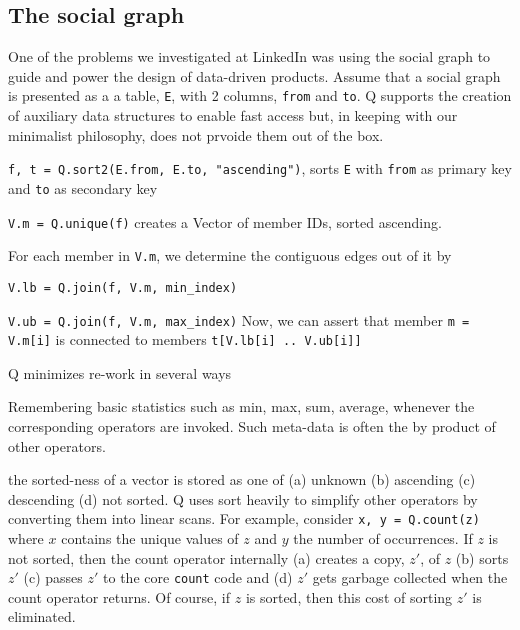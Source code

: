 \subsection{The social graph}
\label{social_graph}

One of the problems we investigated at LinkedIn was using the social graph to
guide and power the design of data-driven products.
Assume that a social graph is presented as a 
a table, {\tt E}, with 2 columns, {\tt from} and {\tt to}. Q supports the
creation of auxiliary data structures to enable fast access but, in keeping with
our minimalist philosophy, does not prvoide them out of the box.
\be
\item {\tt f, t = Q.sort2(E.from, E.to, "ascending")}, sorts {\tt E}
with {\tt from} as primary key and {\tt to} as
secondary key
\item {\tt V.m = Q.unique(f)} creates a Vector of 
member IDs, sorted ascending. 
\item For each member in {\tt V.m}, we determine the contiguous edges out of it
  by 
  \be
\item {\tt V.lb = Q.join(f, V.m, min\_index)}
\item {\tt V.ub = Q.join(f, V.m, max\_index)}
  \ee
Now, we can assert that member
{\tt m = V.m[i]} is connected to members {\tt t[V.lb[i] .. V.ub[i]]}
\ee

Q minimizes re-work in several ways
\be
\item 
Remembering basic statistics such as min, max, sum, average, whenever the
corresponding operators are invoked. 
Such meta-data is often the by product of other operators.
\item the sorted-ness of a vector is
stored as one of (a) unknown (b) ascending (c) descending (d) not sorted. 
Q
uses sort heavily to simplify other operators by converting them into linear
scans. 
For example, consider {\tt x, y  = Q.count(z)} where \(x\) contains the
unique values of \(z\) and \(y\) the number of occurrences. If \(z\) is not
sorted, then the count operator internally (a) creates a copy, \(z'\), of \(z\)
(b) sorts \(z'\) (c) passes \(z'\) to the core {\tt count} code and (d) \(z'\) gets
garbage collected when the count operator returns. Of course, if \(z\) is
sorted, then this cost of sorting \(z'\) is eliminated.

\ee
